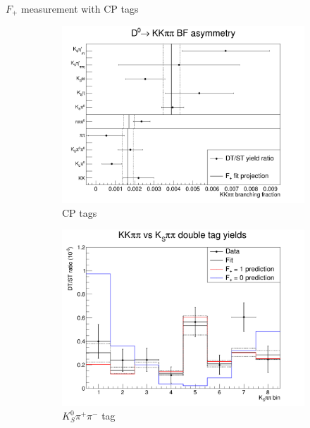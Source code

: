 \documentclass{beamer}
\begin{document}
\begin{frame}{$F_+$ measurement with CP tags}
  \begin{figure}
    \begin{subfigure}{0.40\textwidth}
      \includegraphics[width = 1.0\textwidth]{Plots/CPeven_fraction_combination_CPtags.png}
      \caption{CP tags}
    \end{subfigure}
    \begin{subfigure}{0.35\textwidth}
      \includegraphics[width = 1.0\textwidth]{Plots/CPeven_fraction_combination_KSpipi.png}
      \caption{$K^0_S\pi^+\pi^-$ tag}
    \end{subfigure}%
    \begin{subfigure}{0.35\textwidth}

\end{subfigure}
\end{figure}
\end{frame}
\end{document}
